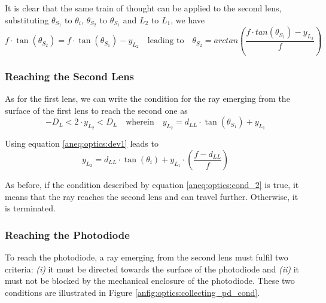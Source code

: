 It is clear that the same train of thought can be applied to the second lens, substituting $\theta_{S_1}$ to $\theta_i$, $\theta_{S_2}$ to $\theta_{S_1}$ and $L_2$ to $L_1$, we have
\begin{equation}
	f \cdot \tan( \theta_{S_2}) = f\cdot \tan(\theta_{S_1}) - y_{L_2} \quad \text{leading to} \quad \theta_{S_2} = arctan \left( \frac{f\cdot tan(\theta_{S_1}) - y_{L_2}}{f} \right)
\end{equation}

\subsubsection{Reaching the Second Lens}

As for the first lens, we can write the condition for the ray emerging from the surface of the first lens to reach the second one as
\begin{equation}\label{aneq:optics:cond_2}
	-D_L < 2\cdot y_{L_2} < D_L \quad \text{wherein}\quad y_{L_2} =  d_{LL} \cdot \tan(\theta_{S_1}) + y_{L_1}
\end{equation}

Using equation \ref{aneq:optics:dev1} leads to
\begin{equation}
	y_{L_2} =  d_{LL} \cdot \tan(\theta_i) + y_{L_1} \cdot \left( \frac{f - d_{LL}}{f} \right)
\end{equation}

As before, if the condition described by equation \ref{aneq:optics:cond_2} is true, it means that the ray reaches the second lens and can travel further. Otherwise, it is terminated.

\subsubsection{Reaching the Photodiode}

To reach the photodiode, a ray emerging from the second lens must fulfil two criteria: \textit{(i)} it must be directed towards the surface of the photodiode and \textit{(ii)} it must not be blocked by the mechanical enclosure of the photodiode. These two conditions are illustrated in Figure \ref{anfig:optics:collecting_pd_cond}.

